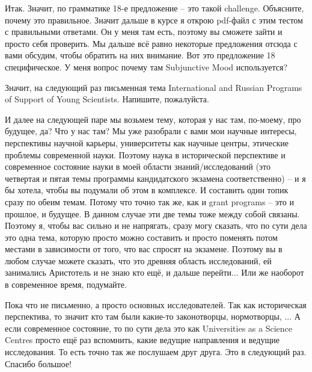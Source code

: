 \documentclass[main.tex]{subfiles}
\begin{document}
Итак.
Значит, по грамматике 18-е предложение -- это такой challenge.
Объясните, почему это правильное.
Значит дальше в курсе я открою pdf-файл с этим тестом с правильными ответами.
Он у меня там есть, поэтому вы сможете зайти и просто себя проверить.
Мы дальше всё равно некоторые предложения отсюда с вами обсудим, чтобы обратить на них внимание.
Вот это предложение 18 специфическое.
У меня вопрос почему там Subjunctive Mood используется?

Значит, на следующий раз письменная тема International and Russian Programs of Support of Young Scientists.
Напишите, пожалуйста.

И далее на следующей паре мы возьмем тему, которая у нас там, по-моему, про будущее, да?
Что у нас там?
Мы уже разобрали с вами мои научные интересы, перспективы научной карьеры, университеты как научные центры, этические проблемы современной науки.
Поэтому наука в исторической перспективе и современное состояние науки в моей области знаний/исследований (это четвертая и пятая темы программы кандидатского экзамена соответственно) -- и я бы хотела, чтобы вы подумали об этом в комплексе.
И составить один топик сразу по обеим темам.
Потому что точно так же, как и grant programs -- это и прошлое, и будущее.
В данном случае эти две темы тоже между собой связаны.
Поэтому я, чтобы вас сильно и не напрягать, сразу могу сказать, что по сути дела это одна тема, которую просто можно составить и просто поменять потом местами в зависимости от того, что вас спросят на экзамене.
Поэтому вы в любом случае можете сказать, что это древняя область исследований, ей занимались Аристотель и не знаю кто ещё, и дальше перейти...
Или же наоборот в современное время, подумайте.

Пока что не письменно, а просто основных исследователей.
Так как историческая перспектива, то значит кто там были какие-то законотворцы, нормотворцы, ...
А если современное состояние, то по сути дела это как Universities as a Science Centres просто ещё раз вспомнить, какие ведущие направления и ведущие исследования.
То есть точно так же послушаем друг друга.
Это в следующий раз.
Спасибо большое!
\end{document}
